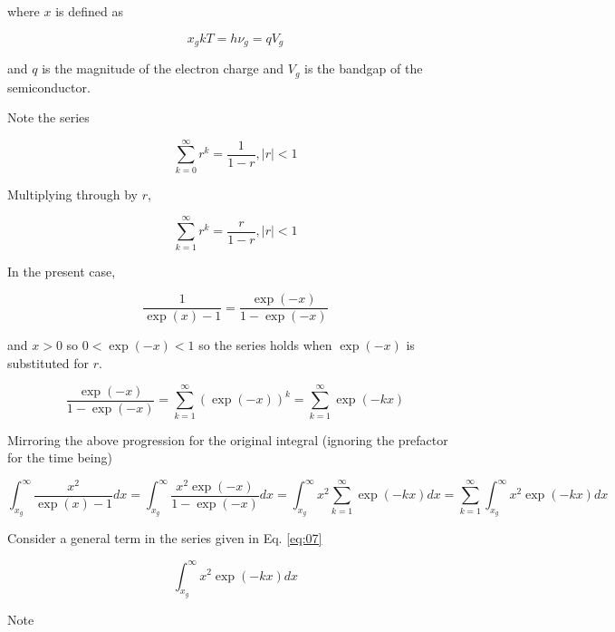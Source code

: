 \documentclass[letterpaper,12pt]{article}
\begin{document}
\noindent where $x$ is defined as

\begin{equation} \label{eq:02}
x_{g}kT = h \nu_{g} = q V_{g}
\end{equation}

\noindent and $q$ is the magnitude of the electron charge and $V_{g}$ is the bandgap of the semiconductor.

Note the series

\begin{equation} \label{eq:03}
\sum_{k = 0}^{\infty} r^{k} = \frac{1}{1-r}, |r| < 1
\end{equation}

\noindent Multiplying through by $r$,

\begin{equation} \label{eq:04}
\sum_{k = 1}^{\infty} r^{k} = \frac{r}{1-r}, |r| < 1
\end{equation}

In the present case,

\begin{equation} \label{eq:05}
\frac{1}{\exp(x) - 1} = \frac{\exp(-x)}{1 - \exp(-x)}
\end{equation}

\noindent and $x > 0$ so $0 < \exp(-x) < 1$ so the series holds when $\exp(-x)$ is substituted for $r$.

\begin{equation} \label{eq:06}
\frac{\exp(-x)}{1 - \exp(-x)} = \sum_{k = 1}^{\infty} \left( \exp(-x) \right)^{k}
= \sum_{k = 1}^{\infty} \exp(-kx)
\end{equation}

Mirroring the above progression for the original integral (ignoring the prefactor for the time being)

\begin{equation} \label{eq:07}
\int_{x_{g}}^{\infty} \frac{x^{2}}{\exp(x) - 1} dx = \int_{x_{g}}^{\infty} \frac{x^{2} \exp(-x)}{1 - \exp(-x)} dx
= \int_{x_{g}}^{\infty} x^{2} \sum_{k = 1}^{\infty} \exp(-kx) dx
= \sum_{k = 1}^{\infty} \int_{x_{g}}^{\infty} x^{2} \exp(-kx) dx
\end{equation}

Consider a general term in the series given in Eq. \ref{eq:07}

\begin{equation} \label{eq:08}
\int_{x_{g}}^{\infty} x^{2} \exp(-kx) dx
\end{equation}

Note
\end{document}
